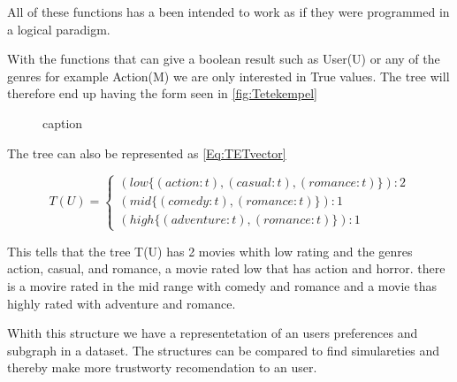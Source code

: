 All of these functions has a been intended to work as if they were programmed in a logical paradigm. 

With the functions that can give a boolean result such as User(U) or any of the genres for example Action(M) we are only interested in True values. The tree will therefore end up having the form seen in \autoref{fig:Tetekempel}

\begin{figure}[H]
    \centering
    \begin{adjustbox}{width=0.5\textwidth}
    
    \end{adjustbox}
    \caption{caption}
    \label{fig:Tetekempel}	
\end{figure}


The tree can also be represented as \autoref{Eq:TETvector}

\begin{equation}\label{Eq:TETvector}
    T(U)=
    \begin{cases}
      (low \{(action:t),(casual:t), (romance:t)\}):2 \\
      (mid \{(comedy:t),(romance:t)\}):1 \\
      (high\{(adventure:t),(romance:t)\}):1
    \end{cases}
\end{equation}

This tells that the tree T(U) has 2 movies whith low rating and the genres action, casual, and romance, a movie rated low that has action and horror. there is a movire rated in the mid range with comedy and romance and a movie thas highly rated with adventure and romance.

Whith this structure we have a representetation of an users preferences and subgraph in a dataset. 
The structures can be compared to find simulareties and thereby make more trustworty recomendation to an user.
